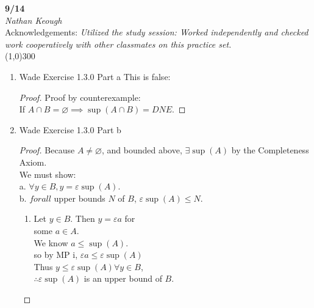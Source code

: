 \documentclass[a4paper]{article}
\begin{document}
    \begin{center}
        \Large \textbf{9/14} \\
        \large \textit{Nathan Keough} \\
        Acknowledgements: \emph{Utilized the study session: Worked independently and checked work cooperatively with other classmates on this practice set.} \vspace{.5pc} \\ \line(1,0){300} 
        \vspace{1pc}
    \end{center} 
    
    \begin{flushleft}
        \begin{enumerate}
            \item
            Wade Exercise 1.3.0 Part a
            This is false: \\

            \begin{proof}
                Proof by counterexample: \\ 

                If $A\cap B = \varnothing \implies \sup (A\cap B) = DNE$.
                
            \end{proof}

            \item
            Wade Exercise 1.3.0 Part b
            \begin{proof}
                Because $A\neq \varnothing$, and bounded above, $\exists \sup (A)$ by the Completeness Axiom. \\
                We must show: \\
                a. $\forall y\in B, y = \varepsilon \sup (A)$. \\
                b. $forall$ upper bounds $N$ of $B$, $\varepsilon \sup (A) \leq N$. 

                \begin{enumerate}
                    \item
                    Let $y \in B$. Then $y=\varepsilon a$ for \\
                    some $a \in A$. \\
                    We know $a \leq \sup (A)$. \\
                    so by MP i, $\varepsilon a \leq \varepsilon \sup (A)$ \\
                    Thus $y \leq \varepsilon \sup (A) \forall y \in B$, \\ 
                    $\therefore \varepsilon \sup (A)$ is an upper bound of $B$.


\end{enumerate}
\end{proof}
\end{enumerate}
\end{flushleft}
\end{document}
